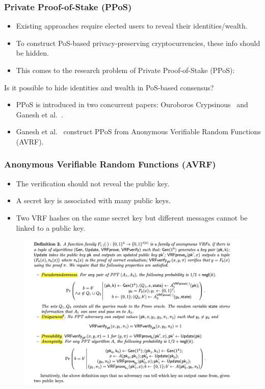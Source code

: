 \documentclass{beamer}
\begin{document}
\begin{frame}
\frametitle{Private Proof-of-Stake (PPoS)}

\begin{itemize}
    \item Existing approaches require elected users to reveal their identities/wealth.
    \item To construct PoS-based privacy-preserving cryptocurrencies, these info should be hidden.
    \item This comes to the research problem of Private Proof-of-Stake (PPoS):
\end{itemize}

\centerline{\color{red} Is it possible to hide identities and wealth in PoS-based consensus?}

\begin{itemize}
    \item PPoS is introduced in two concurrent papers: Ouroboros Crypsinous~\cite{kerber2019ouroboros} and Ganesh et al.~\cite{ganesh2019proof}.
    \item Ganesh et al.~\cite{ganesh2019proof} construct PPoS from Anonymous Verifiable Random Functions (AVRF).
\end{itemize}

\end{frame}


\begin{frame}
\frametitle{Anonymous Verifiable Random Functions (AVRF)}
    
\begin{itemize}
    \item The verification should not reveal the public key.
    \item A secret key is associated with many public keys.
    \item Two VRF hashes on the same secret key but different messages cannot be linked to a public key.
\end{itemize}

\begin{figure}
    \centering
    \includegraphics[width=.7\textwidth]{figs/avrf-def.png}
\end{figure}


\end{frame}
\end{document}
